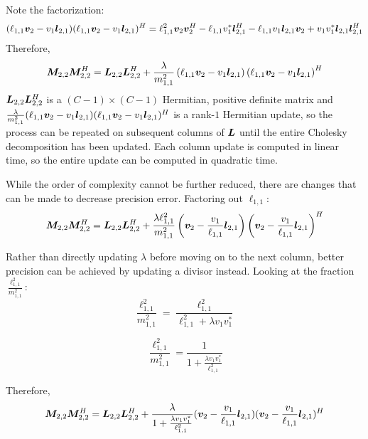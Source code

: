 \begin{appendices}
Note the factorization:
\begin{equation}
(\ell_{1,1}\bm{v}_2 - v_1\bm{l}_{2,1})(\ell_{1,1}\bm{v}_2 - v_1\bm{l}_{2,1})^H = \ell_{1,1}^2\bm{v}_2\bm{v}_2^H - \ell_{1,1}v_1^{*}\bm{l}_{2,1}^H - \ell_{1,1}v_1\bm{l}_{2,1}\bm{v}_2 + v_1 v_1^{*}\bm{l}_{2,1}\bm{l}_{2,1}^H
\end{equation}
Therefore,
\begin{equation}
\bm{M}_{2,2}\bm{M}_{2,2}^H = \bm{L}_{2,2}\bm{L}_{2,2}^H + \frac{\lambda}{m_{1,1}^2}\left(\ell_{1,1}\bm{v}_2 - v_1\bm{l}_{2,1}\right)\left(\ell_{1,1}\bm{v}_2 - v_1\bm{l}_{2,1}\right)^H
\end{equation}
$\bm{L}_{2,2}\bm{L}_{2,2}^H$ is a $ (C - 1) \times (C - 1)$ Hermitian, positive definite matrix and $\frac{\lambda}{m_{1,1}^2}(\ell_{1,1}\bm{v}_2 - v_1\bm{l}_{2,1})(\ell_{1,1}\bm{v}_2 - v_1\bm{l}_{2,1})^H$ is a rank-$1$ Hermitian update, so the process can be repeated on subsequent columns of $\bm{L}$ until the entire Cholesky decomposition has been updated. Each column update is computed in linear time, so the entire update can be computed in quadratic time.

While the order of complexity cannot be further reduced, there are changes that can be made to decrease precision error. Factoring out $\ell_{1,1}$:
\begin{equation}
\bm{M}_{2,2}\bm{M}_{2,2}^H = \bm{L}_{2,2}\bm{L}_{2,2}^H + \frac{\lambda\ell_{1,1}^2}{m_{1,1}^2}\left(\bm{v}_2 - \frac{v_1}{\ell_{1,1}}\bm{l}_{2,1}\right)\left(\bm{v}_2 - \frac{v_1}{\ell_{1,1}}\bm{l}_{2,1}\right)^H
\end{equation}

Rather than directly updating $\lambda$ before moving on to the next column, better precision can be achieved by updating a divisor instead.  Looking at the fraction $\frac{\ell_{1,1}^2}{m_{1,1}^2}$:
\begin{equation}
\frac{\ell_{1,1}^2}{m_{1,1}^2} = \frac{\ell_{1,1}^2}{\ell_{1,1}^2 + \lambda v_1 v_1^{*}}
\end{equation}

\begin{equation}
\frac{\ell_{1,1}^2}{m_{1,1}^2} = \frac{1}{1 + \frac{\lambda v_1 v_1^{*}}{\ell_{1,1}^2}}
\end{equation}

Therefore,
\begin{equation}
\bm{M}_{2,2}\bm{M}_{2,2}^H = \bm{L}_{2,2}\bm{L}_{2,2}^H + \frac{\lambda}{1 + \frac{\lambda v_1 v_1^{*}}{\ell_{1,1}^2}}(\bm{v}_2 - \frac{v_1}{\ell_{1,1}}\bm{l}_{2,1})(\bm{v}_2 - \frac{v_1}{\ell_{1,1}}\bm{l}_{2,1})^H
\end{equation}


\end{appendices}
